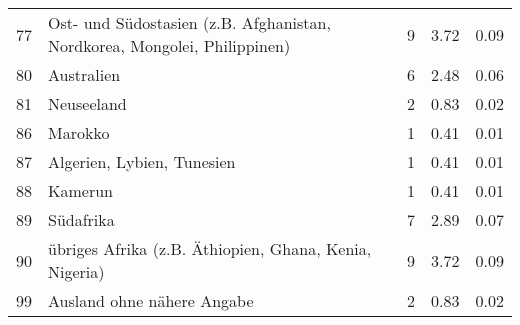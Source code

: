 \begin{longtable}{lXrrr}
        77 & \multicolumn{1}{X}{Ost- und Südostasien (z.B. Afghanistan, Nordkorea, Mongolei, Philippinen)} & %
          \num{9} &
          \num[round-mode=places,round-precision=2]{3.72} &
          \num[round-mode=places,round-precision=2]{0.09} \\

        80 & \multicolumn{1}{X}{Australien} & %
          \num{6} &
          \num[round-mode=places,round-precision=2]{2.48} &
          \num[round-mode=places,round-precision=2]{0.06} \\

        81 & \multicolumn{1}{X}{Neuseeland} & %
          \num{2} &
          \num[round-mode=places,round-precision=2]{0.83} &
          \num[round-mode=places,round-precision=2]{0.02} \\

        86 & \multicolumn{1}{X}{Marokko} & %
          \num{1} &
          \num[round-mode=places,round-precision=2]{0.41} &
          \num[round-mode=places,round-precision=2]{0.01} \\

        87 & \multicolumn{1}{X}{Algerien, Lybien, Tunesien} & %
          \num{1} &
          \num[round-mode=places,round-precision=2]{0.41} &
          \num[round-mode=places,round-precision=2]{0.01} \\

        88 & \multicolumn{1}{X}{Kamerun} & %
          \num{1} &
          \num[round-mode=places,round-precision=2]{0.41} &
          \num[round-mode=places,round-precision=2]{0.01} \\

        89 & \multicolumn{1}{X}{Südafrika} & %
          \num{7} &
          \num[round-mode=places,round-precision=2]{2.89} &
          \num[round-mode=places,round-precision=2]{0.07} \\

        90 & \multicolumn{1}{X}{übriges Afrika (z.B. Äthiopien, Ghana, Kenia, Nigeria)} & %
          \num{9} &
          \num[round-mode=places,round-precision=2]{3.72} &
          \num[round-mode=places,round-precision=2]{0.09} \\

        99 & \multicolumn{1}{X}{Ausland ohne nähere Angabe} & %
          \num{2} &
          \num[round-mode=places,round-precision=2]{0.83} &
          \num[round-mode=places,round-precision=2]{0.02} \\


\end{longtable}
